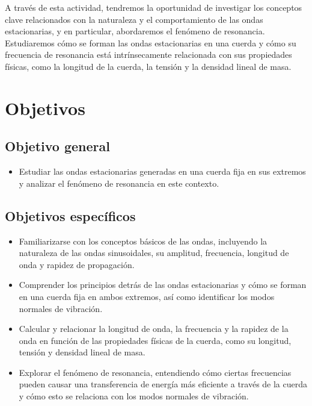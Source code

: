 \documentclass[twocolumn, 12pt]{article}
\begin{document}
A través de esta actividad, tendremos la oportunidad de
investigar los conceptos clave relacionados con la
naturaleza y el comportamiento de las ondas estacionarias,
y en particular, abordaremos el fenómeno de resonancia.
Estudiaremos cómo se forman las ondas estacionarias en una
cuerda y cómo su frecuencia de resonancia está
intrínsecamente relacionada con sus propiedades físicas,
como la longitud de la cuerda, la tensión y la densidad
lineal de masa.

\section{Objetivos}

\subsection{Objetivo general}

\begin{itemize}[label=$\triangleright$]
    \item Estudiar las ondas estacionarias generadas en una cuerda
          fija en sus extremos y analizar el fenómeno de resonancia
          en este contexto.
\end{itemize}

\subsection{Objetivos específicos}

\begin{itemize}[label=$\triangleright$]
    \item Familiarizarse con los conceptos básicos de las ondas,
          incluyendo la naturaleza de las ondas sinusoidales, su
          amplitud, frecuencia, longitud de onda y rapidez de
          propagación.

    \item Comprender los principios detrás de las ondas estacionarias
          y cómo se forman en una cuerda fija en ambos extremos, así
          como identificar los modos normales de vibración.

    \item Calcular y relacionar la longitud de onda, la frecuencia y
          la rapidez de la onda en función de las propiedades físicas
          de la cuerda, como su longitud, tensión y densidad lineal
          de masa.

    \item Explorar el fenómeno de resonancia, entendiendo cómo
          ciertas frecuencias pueden causar una transferencia de
          energía más eficiente a través de la cuerda y cómo esto se
          relaciona con los modos normales de vibración.
\end{itemize}
\end{document}

